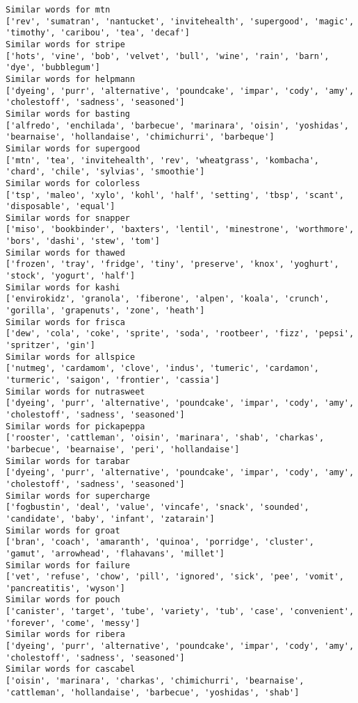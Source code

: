 \documentclass[11pt]{article}
\begin{document}
\begin{Verbatim}[commandchars=\\\{\}]
Similar words for mtn
['rev', 'sumatran', 'nantucket', 'invitehealth', 'supergood', 'magic', 'timothy', 'caribou', 'tea', 'decaf']
Similar words for stripe
['hots', 'vine', 'bob', 'velvet', 'bull', 'wine', 'rain', 'barn', 'dye', 'bubblegum']
Similar words for helpmann
['dyeing', 'purr', 'alternative', 'poundcake', 'impar', 'cody', 'amy', 'cholestoff', 'sadness', 'seasoned']
Similar words for basting
['alfredo', 'enchilada', 'barbecue', 'marinara', 'oisin', 'yoshidas', 'bearnaise', 'hollandaise', 'chimichurri', 'barbeque']
Similar words for supergood
['mtn', 'tea', 'invitehealth', 'rev', 'wheatgrass', 'kombacha', 'chard', 'chile', 'sylvias', 'smoothie']
Similar words for colorless
['tsp', 'maleo', 'xylo', 'kohl', 'half', 'setting', 'tbsp', 'scant', 'disposable', 'equal']
Similar words for snapper
['miso', 'bookbinder', 'baxters', 'lentil', 'minestrone', 'worthmore', 'bors', 'dashi', 'stew', 'tom']
Similar words for thawed
['frozen', 'tray', 'fridge', 'tiny', 'preserve', 'knox', 'yoghurt', 'stock', 'yogurt', 'half']
Similar words for kashi
['envirokidz', 'granola', 'fiberone', 'alpen', 'koala', 'crunch', 'gorilla', 'grapenuts', 'zone', 'heath']
Similar words for frisca
['dew', 'cola', 'coke', 'sprite', 'soda', 'rootbeer', 'fizz', 'pepsi', 'spritzer', 'gin']
Similar words for allspice
['nutmeg', 'cardamom', 'clove', 'indus', 'tumeric', 'cardamon', 'turmeric', 'saigon', 'frontier', 'cassia']
Similar words for nutrasweet
['dyeing', 'purr', 'alternative', 'poundcake', 'impar', 'cody', 'amy', 'cholestoff', 'sadness', 'seasoned']
Similar words for pickapeppa
['rooster', 'cattleman', 'oisin', 'marinara', 'shab', 'charkas', 'barbecue', 'bearnaise', 'peri', 'hollandaise']
Similar words for tarabar
['dyeing', 'purr', 'alternative', 'poundcake', 'impar', 'cody', 'amy', 'cholestoff', 'sadness', 'seasoned']
Similar words for supercharge
['fogbustin', 'deal', 'value', 'vincafe', 'snack', 'sounded', 'candidate', 'baby', 'infant', 'zatarain']
Similar words for groat
['bran', 'coach', 'amaranth', 'quinoa', 'porridge', 'cluster', 'gamut', 'arrowhead', 'flahavans', 'millet']
Similar words for failure
['vet', 'refuse', 'chow', 'pill', 'ignored', 'sick', 'pee', 'vomit', 'pancreatitis', 'wyson']
Similar words for pouch
['canister', 'target', 'tube', 'variety', 'tub', 'case', 'convenient', 'forever', 'come', 'messy']
Similar words for ribera
['dyeing', 'purr', 'alternative', 'poundcake', 'impar', 'cody', 'amy', 'cholestoff', 'sadness', 'seasoned']
Similar words for cascabel
['oisin', 'marinara', 'charkas', 'chimichurri', 'bearnaise', 'cattleman', 'hollandaise', 'barbecue', 'yoshidas', 'shab']

\end{Verbatim}
\end{document}
